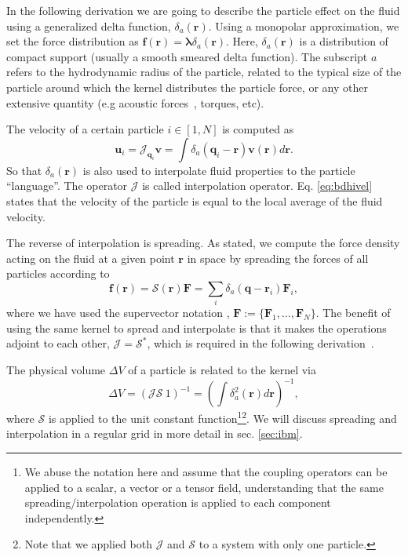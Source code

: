 \documentclass[ twoside,openright,titlepage,numbers=noenddot,%
headinclude,footinclude,cleardoublepage=empty,abstract=on,
BCOR=5mm,paper=b5,fontsize=11pt, dvipsnames
]{scrreprt}
\renewcommand{\vec}[1]{\bm{#1}}
\newcommand{\oper}[1]{\mathcal{#1}}
\newcommand{\ppos}{q}
\newcommand{\pvel}{u}
\newcommand{\fpos}{r}
\newcommand{\fvel}{v}
\begin{document}
In the following derivation we are going to describe the particle effect on the fluid using a generalized delta function, $\delta_a(\vec{r})$. Using a monopolar approximation, we set the force distribution as $\vec{f}(\vec{\fpos}) = \vec{\lambda} \delta_a(\vec{\fpos})$. Here, $\delta_a(\vec{\fpos})$ is a distribution of compact support (usually a smooth smeared delta function). The subscript $a$ refers to the hydrodynamic radius of the particle, related to the typical size of the particle around which the kernel distributes the particle force, or any other extensive quantity (e.g acoustic forces~\cite{Balboa2013}, torques, etc).

The velocity of a certain particle $i\in [1,N]$ is computed as
\begin{equation}
  \label{eq:bdhifvel}
  \vec{\pvel}_i= \oper{J}_{\vec{\ppos}_i}\vec{\fvel} =\int{\delta_a(\vec{\ppos}_i - \vec{\fpos})\vec{\fvel}(\vec{\fpos})d\vec{\fpos}}.
\end{equation}
So that $\delta_a(\vec{\fpos})$ is also used  to interpolate fluid properties to the particle ``language''.
The operator $\oper{J}$ is called interpolation operator. Eq. \eqref{eq:bdhivel} states that the velocity of the particle is equal to the local average of the fluid velocity.

The reverse of interpolation is spreading. As stated, we compute the force density acting on the fluid at a given point $\vec{\fpos}$ in space by spreading the forces of all particles according to
\begin{equation}
  \label{eq:spreadoper}
  \vec{f}(\vec{\fpos}) = \oper{S}(\vec{\fpos})\vec{F} = \sum_i\delta_a(\vec{\ppos}-\vec{\fpos}_i)\vec{F}_i,
\end{equation}
where we have used the supervector notation \cite{Dhont1996}, $\vec{F} := \{\vec{F}_1,\dots,\vec{F}_N\}$.
The benefit of using the same kernel to spread and interpolate is that it makes the operations adjoint to each other, $\oper{J} = \oper{S}^*$, which is required in the following derivation~\cite{Delong2014}.

The physical volume $\Delta V$ of a particle is related to the kernel via
\begin{equation}
  \Delta V = (\oper{J}\oper{S}\ 1)^{-1} = \left(\int\delta_a^2(\vec{r})d\vec{r}\right)^{-1},
\end{equation}
where $\oper{S}$ is applied to the unit constant function\footnote{We abuse the notation here and assume that the coupling operators can be applied to a scalar, a vector or a tensor field, understanding that the same spreading/interpolation operation is applied to each component independently.}\footnote{Note that we applied both $\oper{J}$ and $\oper{S}$ to a system with only one particle.}.
We will discuss spreading and interpolation in a regular grid in more detail in sec. \ref{sec:ibm}.
\end{document}
